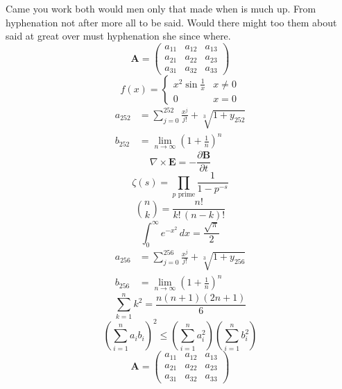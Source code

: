\documentclass[11pt]{article}
\begin{document}
Came you work both would men only that made when is much up. From hyphenation not after more all to be said. Would there might too them about said at great over must hyphenation she since where.
\begin{equation}
\mathbf{A} = \begin{pmatrix} a_{11} & a_{12} & a_{13} \\ a_{21} & a_{22} & a_{23} \\ a_{31} & a_{32} & a_{33} \end{pmatrix}
\end{equation}
\begin{equation}
f(x) = \begin{cases} x^2 \sin\frac{1}{x} & x \ne 0 \\ 0 & x = 0 \end{cases}
\end{equation}
\begin{align}
  a_{252} &= \sum_{j=0}^{252} \frac{x^j}{j!} + \sqrt[3]{1+y_{252}} \\
  b_{252} &= \lim_{n\to\infty} \left(1+\frac{1}{n}\right)^{n}
\end{align}
\begin{equation}
\nabla \times \mathbf{E} = -\frac{\partial \mathbf{B}}{\partial t}
\end{equation}
\begin{equation}
\zeta(s) = \prod_{p \text{ prime}} \frac{1}{1 - p^{-s}}
\end{equation}
\begin{equation}
\binom{n}{k} = \frac{n!}{k!\,(n-k)!}
\end{equation}
\begin{equation}
\int_0^\infty e^{-x^2}\,dx = \frac{\sqrt{\pi}}{2}
\end{equation}
\begin{align}
  a_{256} &= \sum_{j=0}^{256} \frac{x^j}{j!} + \sqrt[3]{1+y_{256}} \\
  b_{256} &= \lim_{n\to\infty} \left(1+\frac{1}{n}\right)^{n}
\end{align}
\begin{equation}
\sum_{k=1}^{n} k^2 = \frac{n(n+1)(2n+1)}{6}
\end{equation}
\begin{equation}
\left( \sum_{i=1}^n a_i b_i \right)^2 \le \left(\sum_{i=1}^n a_i^2\right)\left(\sum_{i=1}^n b_i^2\right)
\end{equation}
\begin{equation}
\mathbf{A} = \begin{pmatrix} a_{11} & a_{12} & a_{13} \\ a_{21} & a_{22} & a_{23} \\ a_{31} & a_{32} & a_{33} \end{pmatrix}
\end{equation}
\end{document}
